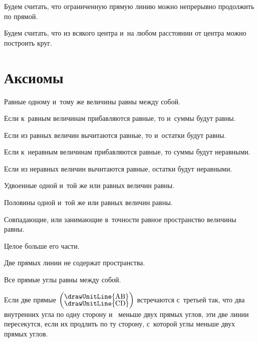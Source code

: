 \documentclass[letters]{byrne-book}
\begin{document}
\startpostulate{}\label{post:I.II}
Будем считать, что ограниченную прямую линию можно непрерывно продолжить по прямой.


\startpostulate{}\label{post:I.III}
Будем считать, что из всякого центра и~на любом расстоянии от центра можно построить круг.


\chapter*{Аксиомы}

\startaxiom{}\label{ax:I.I}
Равные одному и~тому же величины равны между собой.


\startaxiom{}\label{ax:I.II}
Если к~равным величинам прибавляются равные, то и~суммы будут равны.


\startaxiom{}\label{ax:I.III}
Если из равных величин вычитаются равные, то и~остатки будут равны.


\startaxiom{}\label{ax:I.IV}
Если к~неравным величинам прибавляются равные, то суммы будут неравными.


\startaxiom{}\label{ax:I.V}
Если из неравных величин вычитаются  равные, остатки будут неравными.


\startaxiom{}\label{ax:I.VI}
Удвоенные одной и~той же или равных величин равны.


\startaxiom{}\label{ax:I.VII}
Половины одной и~той же или равных величин равны.


\startaxiom{}\label{ax:I.VIII}
Совпадающие, или занимающие в~точности равное пространство величины равны.


\startaxiom{}\label{ax:I.IX}
Целое больше его части.


\startaxiom{}\label{ax:I.X}
Две прямых линии не содержат пространства.


\startaxiom{}\label{ax:I.XI}
Все прямые углы равны между собой.


\startaxiom{}\label{ax:I.XII}
\drawCurrentPictureInMargin
Если две прямые $\left(\vcenter{\nointerlineskip\hbox{\drawUnitLine{AB}}\nointerlineskip\hbox{\drawUnitLine{CD}}}\right)$ встречаются с~третьей  так, что два внутренних угла по одну сторону  и~ меньше двух прямых углов, эти две линии пересекутся, если их продлить по ту сторону, с~которой углы меньше двух прямых углов.
\end{document}
